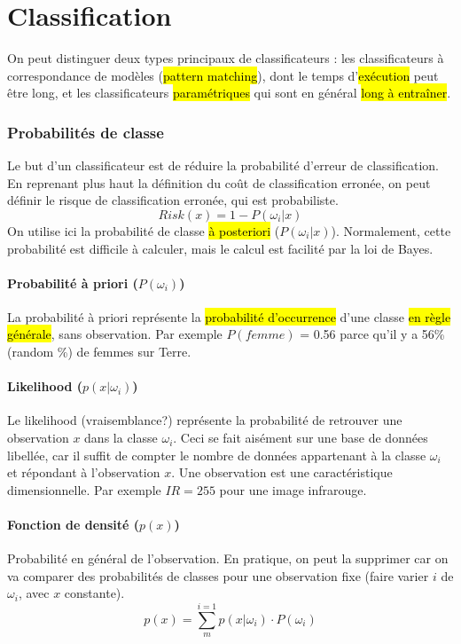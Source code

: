 \documentclass[letterpaper, 12pt]{article}
\newcommand{\alinea}{
\hspace*{0.5cm}}
\begin{document}
\part{Classification}
	\alinea On peut distinguer deux types principaux de classificateurs : les classificateurs à correspondance de modèles 
		(\hl{pattern matching}), dont le temps d'\hl{exécution} peut être long, et les classificateurs \hl{paramétriques} qui sont 
		en général \hl{long à entraîner}.
	\section{Probabilités de classe}
		\alinea Le but d'un classificateur est de réduire la probabilité d'erreur de classification. En reprenant plus haut la 
			définition du coût de classification erronée, on peut définir le risque de classification erronée, qui est probabiliste.
			$$ Risk(x) = 1 - P(\omega_i|x) $$
			On utilise ici la probabilité de classe \hl{à posteriori} ($P(\omega_i|x)$). Normalement, cette probabilité est difficile à
			calculer, mais le calcul est facilité par la loi de Bayes.
		\subsection{Probabilité à priori ($P(\omega_i)$)}
			\alinea La probabilité à priori représente la \hl{probabilité d'occurrence} d'une classe \hl{en règle générale}, sans 
				observation. Par exemple $P(femme)$ = 0.56 parce qu'il y a 56\% (random \%) de femmes sur Terre.
		\subsection{Likelihood ($p(x|\omega_i)$)}
			\alinea Le likelihood (vraisemblance?) représente la probabilité de retrouver une observation $x$ dans la classe $\omega_i$.
				Ceci se fait aisément sur une base de données libellée, car il suffit de compter le nombre de données appartenant à la
				classe $\omega_i$ et répondant à l'observation $x$. Une observation est une caractéristique dimensionnelle. Par exemple
				$IR=255$ pour une image infrarouge.
		\subsection{Fonction de densité ($p(x)$)}
			\alinea Probabilité en général de l'observation. En pratique, on peut la supprimer car on va comparer des probabilités de
				classes pour une observation fixe (faire varier $i$ de $\omega_i$, avec $x$ constante). 
				$$p(x) = \sum\limits^{i=1}_{m} p(x|\omega_i) \cdot P(\omega_i)$$
\end{document}

